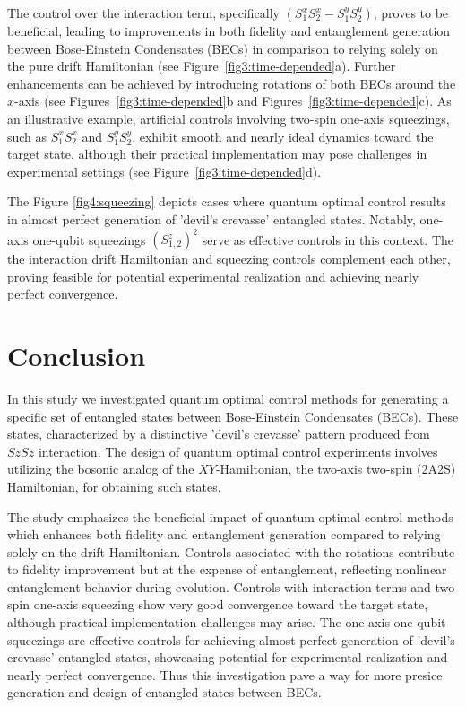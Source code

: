 \documentclass[
aps,%
12pt,%
final,%
notitlepage,%
oneside,%
onecolumn,%
nobibnotes,%
nofootinbib,%
superscriptaddress,%
noshowpacs,%
centertags]%
{revtex4}
\begin{document}
The control over the interaction term, specifically $(S_1^x S_2^x - S_1^y S_2^y)$, proves to be beneficial, leading to improvements in both fidelity and entanglement generation between Bose-Einstein Condensates (BECs) in comparison to relying solely on the pure drift Hamiltonian (see Figure~\ref{fig3:time-depended}a). Further enhancements can be achieved by introducing rotations of both BECs around the $x$-axis (see Figures~\ref{fig3:time-depended}b and Figures~\ref{fig3:time-depended}c). As an illustrative example, artificial controls involving two-spin one-axis squeezings, such as $S_1^x S_2^x$ and $S_1^y S_2^y$, exhibit smooth and nearly ideal dynamics toward the target state, although their practical implementation may pose challenges in experimental settings (see Figure~\ref{fig3:time-depended}d).

The Figure \ref{fig4:squeezing} depicts cases where quantum optimal control results in almost perfect generation of 'devil’s crevasse' entangled states. Notably, one-axis one-qubit squeezings $(S_{1,2}^z)^2$ serve as effective controls in this context. The the interaction drift Hamiltonian and squeezing controls complement each other, proving feasible for potential experimental realization and achieving nearly perfect convergence.   


\section{Conclusion}

In this study we investigated quantum optimal control methods for generating a specific set of entangled states between Bose-Einstein Condensates (BECs). These states, characterized by a distinctive 'devil’s crevasse' pattern produced from $SzSz$ interaction. The design of quantum optimal control experiments involves utilizing the bosonic analog of the $XY$-Hamiltonian, the two-axis two-spin (2A2S) Hamiltonian, for obtaining such states.

The study emphasizes the beneficial impact of quantum optimal control methods which enhances both fidelity and entanglement generation compared to relying solely on the drift Hamiltonian. Controls associated with the rotations  contribute to fidelity improvement but at the expense of entanglement, reflecting nonlinear entanglement behavior during evolution. Controls with interaction terms and two-spin one-axis squeezing show very good convergence toward the target state, although practical implementation challenges may arise. The one-axis one-qubit squeezings are effective controls for achieving almost perfect generation of 'devil’s crevasse' entangled states, showcasing potential for experimental realization and nearly perfect convergence. Thus this investigation pave a way for more presice generation and design of entangled states between BECs. 
\end{document}
